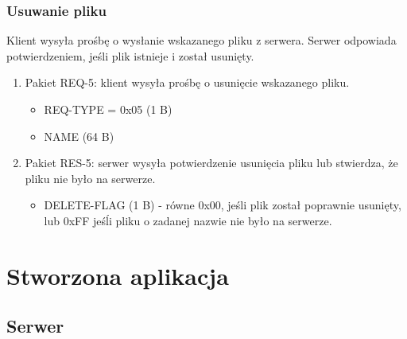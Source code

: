 \documentclass{article}
\begin{document}
	\subsubsection{Usuwanie pliku}
	Klient wysyła prośbę o wysłanie wskazanego pliku z serwera. Serwer odpowiada potwierdzeniem, jeśli plik istnieje i został usunięty. 
	\begin{enumerate}
		\item Pakiet REQ-5: klient wysyła prośbę o usunięcie wskazanego pliku. 
		\begin{itemize}
			\item REQ-TYPE = 0x05 (1 B)
			\item NAME (64 B)
		\end{itemize}
	
		\item Pakiet RES-5: serwer wysyła potwierdzenie usunięcia pliku lub stwierdza, że pliku nie było na serwerze. 
		\begin{itemize}
			\item DELETE-FLAG (1 B) - równe 0x00, jeśli plik został poprawnie usunięty, lub 0xFF jeśĺi pliku o zadanej nazwie nie było na serwerze. 
		\end{itemize}
		
	\end{enumerate}
		

	\section{Stworzona aplikacja}
	
	\subsection{Serwer}
	
\end{document}

